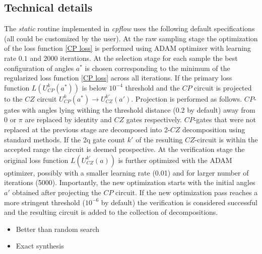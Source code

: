 \documentclass[amsfonts, amssymb, aps, nofootinbib]{revtex4-2}
\newcommand{\cpflow}{\textit{cpflow }}
\begin{document}
\subsection{Technical details}
The \textit{static} routine implemented in \cpflow uses the following default specifications (all could be customized by the user). At the raw sampling stage the optimization of the loss function \eqref{CP loss} is performed using ADAM\cite{} optimizer with learning rate $0.1$ and 2000 iterations. At the selection stage for each sample the best configuration of angles $a^*$ is chosen corresponding to the minimum of the regularized loss function \eqref{CP loss} across all iterations. If the primary loss function $L(U_{CP}^k(a^*))$ is below $10^{-4}$ threshold and the $CP$ circuit is projected to the $CZ$ circuit $U_{CP}^k(a^*)\to U_{CZ}^{k'}(a')$. Projection is performed as follows. $CP$-gates with angles lying withing the threshold distance (0.2 by default) away from $0$ or $\pi$ are replaced by identity and $CZ$ gates respectively.  $CP$-gates that were not replaced at the previous stage are decomposed into 2-$CZ$ decomposition using standard methods. If the 2q gate count $k'$ of the resulting $CZ$-circuit is within the accepted range the circuit is deemed prospective. At the verification stage the original loss function $L(U_{CZ}^{k'}(a))$ is further optimized with the ADAM optimizer, possibly with a smaller learning rate (0.01) and for larger number of iterations (5000). Importantly, the new optimization starts with the initial angles $a'$ obtained after projecting the $CP$ circuit. If the new optimization pass reaches a more stringent threshold ($10^{-6}$ by default) the verification is considered successful and the resulting circuit is added to the collection of decompositions.



\begin{itemize}
	\item Better than random search
	\item Exact synthesis
\end{itemize}
\end{document}
